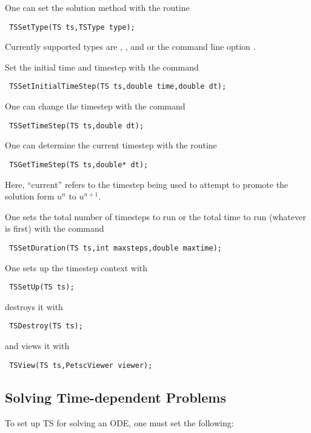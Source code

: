 One can set the solution method with the routine
\begin{verbatim}
 TSSetType(TS ts,TSType type);
\end{verbatim}
 Currently supported types are ,
, and 
  
or the command line option
.  


Set the initial time and timestep with the command
\begin{verbatim}
 TSSetInitialTimeStep(TS ts,double time,double dt);
\end{verbatim}
One  can change the timestep with the command
\begin{verbatim}
 TSSetTimeStep(TS ts,double dt);
\end{verbatim}
One  
can  determine the current timestep with the routine
\begin{verbatim}
 TSGetTimeStep(TS ts,double* dt);
\end{verbatim}
Here, ``current'' refers to the timestep being used to attempt to
promote the solution form $ u^n $ to $ u^{n+1}. $

One sets the total number of timesteps to run or the total time to run 
(whatever is first) with the command 
\begin{verbatim}
 TSSetDuration(TS ts,int maxsteps,double maxtime);
\end{verbatim}
One sets up the timestep context with 
\begin{verbatim}
 TSSetUp(TS ts);
\end{verbatim}
destroys it with 
\begin{verbatim}
 TSDestroy(TS ts);
\end{verbatim}
and views it with 
\begin{verbatim}
 TSView(TS ts,PetscViewer viewer);
\end{verbatim}

\subsection{Solving Time-dependent Problems}
To set up TS for solving an ODE, one must set the following:

